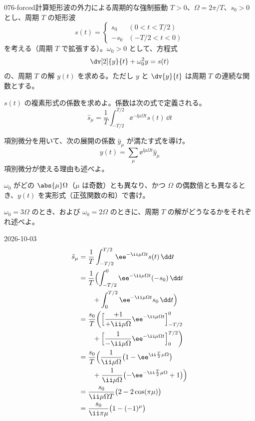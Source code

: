 \documentclass[uplatex,dvipdfmx,a4paper,11pt]{jsarticle}
\begin{document}
\begin{mondai}{076-forced}{計算}{矩形波の外力による周期的な強制振動}
$T>0$、$\Omega=2\pi/T$、$s_0>0$ とし、周期 $T$ の矩形波
\[
s(t)=\begin{cases}s_0&(0<t<T/2)\\-s_0&(-T/2<t<0)\end{cases}
\]
を考える（周期 $T$ で拡張する）。$\omega_0>0$ として、方程式
\[
\dv[2]{y}{t}+\omega_0^{2}y=s(t)
\]
の、周期 $T$ の解 $y(t)$ を求める。ただし $y$ と $\dv{y}{t}$ は周期 $T$ の連続な関数とする。
\begin{shoumon}
  \item $s(t)$ の複素形式の係数を求めよ。係数は次の式で定義される。
\[
\hat{s}_{\mu}=\frac{1}{T}\int_{-T/2}^{T/2}\ee^{-\ii\mu\Omega t}s(t)\,\dd t
\]
  \item 項別微分を用いて、次の展開の係数 $\hat{y}_{\mu}$ が満たす式を導け。
\[
y(t)=\sum_{\mu}\ee^{\ii\mu\Omega t}\hat{y}_{\mu}
\]
項別微分が使える理由も述べよ。
  \item $\omega_0$ がどの $\abs{\mu}\Omega$（$\mu$ は奇数）とも異なり、かつ $\Omega$ の偶数倍とも異なるとき、$y(t)$ を実形式（正弦関数の和）で書け。
  \item $\omega_0=3\Omega$ のとき、および $\omega_0=2\Omega$ のときに、周期 $T$ の解がどうなるかをそれぞれ述べよ。
\end{shoumon}
\begin{kotaeutsushi}{2026-10-03}
\begin{align*}
  \hat{s}_{\mu}&=\frac{1}{T}\int_{-T/2}^{T/2}\ee^{-\ii\mu\Omega t}s(t)\,\dd t\\
  &=\frac{1}{T}\Bigl(\int_{-T/2}^{0}\ee^{-\ii\mu\Omega t}(-s_0)\,\dd t\\
  &\qquad+\int_{0}^{T/2}\ee^{-\ii\mu\Omega t}s_0\,\dd t\Bigr)\\
  &=\frac{s_0}{T}\biggl(\Bigl[\frac{+1}{+\ii\mu\Omega}\ee^{-\ii\mu\Omega t}\Bigr]_{-T/2}^{0}\\
  &\qquad+\Bigl[\frac{1}{-\ii\mu\Omega}\ee^{-\ii\mu\Omega t}\Bigr]_{0}^{T/2}\biggr)\\
  &=\frac{s_0}{T}\Bigl(\frac{1}{\ii\mu\Omega}\bigl(1-\ee^{\ii\frac{T}{2}\mu\Omega}\bigr)\\
  &\qquad+\frac{1}{\ii\mu\Omega}\bigl(-\ee^{-\ii\frac{T}{2}\mu\Omega}+1\bigr)\Bigr)\\
  &=\frac{s_0}{\ii\mu\Omega T}\bigl(2-2\cos(\pi\mu)\bigr)\\
  &=\frac{s_0}{\ii\pi\mu}\bigl(1-(-1)^{\mu}\bigr)
\end{align*}

\end{kotaeutsushi}
\end{mondai}
\end{document}

